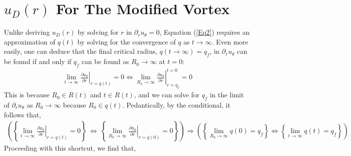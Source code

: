 \documentclass{article}
\begin{document}
\section{$u_{D}(r)$ For The Modified Vortex}
Unlike deriving $u_D(r)$ by solving for $r$ in $\partial_r u_\theta =0$, Equation (\ref{Eq2}) requires an approximation of $q(t)$ by solving for the convergence of $q$ as $t\to \infty$. Even more easily, one can deduce that the final critical radius, $q(t \to \infty)=q_f$, in $\partial_r u_\theta$ can be found if and only if $q_f$ can be found as $R_0 \to \infty$ at $t=0$:
\begin{align*}
    \displaystyle \lim_{t \to \infty} \left. \frac{\partial u_\theta}{\partial r}\right|_{r=q(t)} = 0 \Leftrightarrow  \left. \displaystyle \lim_{R_0 \to \infty} \frac{\partial u_\theta}{\partial r}\right|_{r=q_f}^{t=0} =0
\end{align*}
This is because $R_0 \in R(t)$ and $t \in R(t)$, and we can solve for $q_f$ in the limit of $\partial_r u_\theta$ as $R_0 \to \infty$ because $R_0 \in q(t)$. Pedantically, by the conditional, it follows that,
\begin{align*}
    \left( \left\{ \displaystyle \lim_{t \to \infty} \left. \frac{\partial u_\theta}{\partial r}\right|_{r=q(t)} = 0 \right\} \: \Leftrightarrow  \:  \left\{ \displaystyle \lim_{R_0 \to \infty} \left. \frac{\partial u_\theta}{\partial r}\right|_{r=q(0)} = 0 \right\} \right) \Rightarrow \left( \left\{ \displaystyle \lim_{R_0 \to \infty} q(0) =q_f\right\} \Leftrightarrow \left\{ \displaystyle \lim_{t \to \infty} q(t)  =q_f  \right\} \right)
\end{align*}
Proceeding with this shortcut, we find that,
\end{document}
